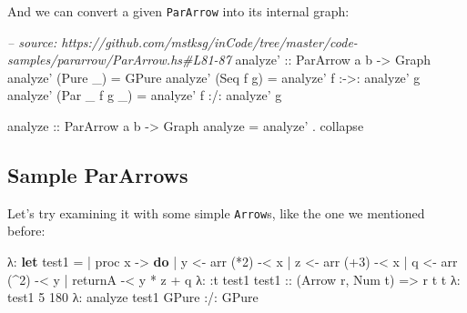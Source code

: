 \documentclass[]{article}
\newenvironment{Shaded}{}{}
\newcommand{\KeywordTok}[1]{\textcolor[rgb]{0.00,0.44,0.13}{\textbf{{#1}}}}
\newcommand{\DataTypeTok}[1]{\textcolor[rgb]{0.56,0.13,0.00}{{#1}}}
\newcommand{\DecValTok}[1]{\textcolor[rgb]{0.25,0.63,0.44}{{#1}}}
\newcommand{\CommentTok}[1]{\textcolor[rgb]{0.38,0.63,0.69}{\textit{{#1}}}}
\newcommand{\OtherTok}[1]{\textcolor[rgb]{0.00,0.44,0.13}{{#1}}}
\newcommand{\FunctionTok}[1]{\textcolor[rgb]{0.02,0.16,0.49}{{#1}}}
\newcommand{\NormalTok}[1]{{#1}}
\begin{document}
And we can convert a given \texttt{ParArrow} into its internal graph:

\begin{Shaded}
\begin{Highlighting}[]
\CommentTok{-- source: https://github.com/mstksg/inCode/tree/master/code-samples/pararrow/ParArrow.hs#L81-87}
\OtherTok{analyze' ::} \DataTypeTok{ParArrow} \NormalTok{a b }\OtherTok{->} \DataTypeTok{Graph}
\NormalTok{analyze' (}\DataTypeTok{Pure} \NormalTok{_) }\FunctionTok{=} \DataTypeTok{GPure}
\NormalTok{analyze' (}\DataTypeTok{Seq} \NormalTok{f g) }\FunctionTok{=} \NormalTok{analyze' f }\FunctionTok{:->:} \NormalTok{analyze' g}
\NormalTok{analyze' (}\DataTypeTok{Par} \NormalTok{_ f g _) }\FunctionTok{=} \NormalTok{analyze' f }\FunctionTok{:/:} \NormalTok{analyze' g}

\OtherTok{analyze ::} \DataTypeTok{ParArrow} \NormalTok{a b }\OtherTok{->} \DataTypeTok{Graph}
\NormalTok{analyze }\FunctionTok{=} \NormalTok{analyze' }\FunctionTok{.} \NormalTok{collapse}
\end{Highlighting}
\end{Shaded}

\subsection{Sample ParArrows}\label{sample-pararrows}

Let's try examining it with some simple \texttt{Arrow}s, like the one we
mentioned before:

\begin{Shaded}
\begin{Highlighting}[]
\NormalTok{λ}\FunctionTok{:} \KeywordTok{let} \NormalTok{test1 }\FunctionTok{=}
 \FunctionTok{|}       \NormalTok{proc x }\OtherTok{->} \KeywordTok{do}
 \FunctionTok{|}       \NormalTok{y }\OtherTok{<-} \NormalTok{arr (}\FunctionTok{*}\DecValTok{2}\NormalTok{) }\FunctionTok{-<} \NormalTok{x}
 \FunctionTok{|}       \NormalTok{z }\OtherTok{<-} \NormalTok{arr (}\FunctionTok{+}\DecValTok{3}\NormalTok{) }\FunctionTok{-<} \NormalTok{x}
 \FunctionTok{|}       \NormalTok{q }\OtherTok{<-} \NormalTok{arr (}\FunctionTok{^}\DecValTok{2}\NormalTok{) }\FunctionTok{-<} \NormalTok{y}
 \FunctionTok{|}       \NormalTok{returnA }\FunctionTok{-<} \NormalTok{y }\FunctionTok{*} \NormalTok{z }\FunctionTok{+} \NormalTok{q}
\NormalTok{λ}\FunctionTok{:} \FunctionTok{:}\NormalTok{t test1}
\OtherTok{test1 ::} \NormalTok{(}\DataTypeTok{Arrow} \NormalTok{r, }\DataTypeTok{Num} \NormalTok{t) }\OtherTok{=>} \NormalTok{r t t}
\NormalTok{λ}\FunctionTok{:} \NormalTok{test1 }\DecValTok{5}
\DecValTok{180}
\NormalTok{λ}\FunctionTok{:} \NormalTok{analyze test1}
\DataTypeTok{GPure} \FunctionTok{:/:} \DataTypeTok{GPure}
\end{Highlighting}
\end{Shaded}
\end{document}
